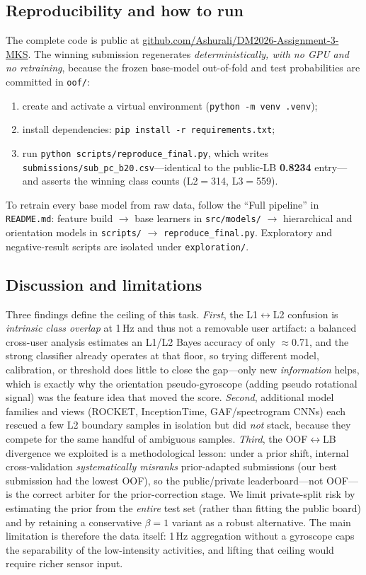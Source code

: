\documentclass[conference]{IEEEtran}
\begin{document}
\subsection{Reproducibility and how to run}
\label{sec:repro}
The complete code is public at \href{https://github.com/Ashurali/DM2026-Assignment-3-MKS}{\color{blue}github.com/Ashurali/DM2026-Assignment-3-MKS}. The winning submission regenerates \emph{deterministically, with no GPU and no retraining}, because the frozen base-model out-of-fold and test probabilities are committed in \texttt{oof/}:
\begin{enumerate}
\item create and activate a virtual environment (\texttt{python -m venv .venv});
\item install dependencies: \texttt{pip install -r requirements.txt};
\item run \texttt{python scripts/reproduce\_final.py}, which writes \texttt{submissions/sub\_pc\_b20.csv}---identical to the public-LB \textbf{0.8234} entry---and asserts the winning class counts (L2$=$314, L3$=$559).
\end{enumerate}
To retrain every base model from raw data, follow the ``Full pipeline'' in \texttt{README.md}: feature build $\rightarrow$ base learners in \texttt{src/models/} $\rightarrow$ hierarchical and orientation models in \texttt{scripts/} $\rightarrow$ \texttt{reproduce\_final.py}. Exploratory and negative-result scripts are isolated under \texttt{exploration/}.

\subsection{Discussion and limitations}
Three findings define the ceiling of this task. \emph{First}, the L1$\leftrightarrow$L2 confusion is
\emph{intrinsic class overlap} at 1\,Hz and thus not a removable user artifact: a balanced cross-user analysis
estimates an L1/L2 Bayes accuracy of only $\approx$0.71, and the strong classifier already operates at that
floor, so trying different model, calibration, or threshold does little to close the gap---only new \emph{information} helps,
which is exactly why the orientation pseudo-gyroscope (adding pseudo rotational signal) was the feature
idea that moved the score. \emph{Second}, additional model families and views (ROCKET, InceptionTime,
GAF/spectrogram CNNs) each rescued a few L2 boundary samples in isolation but did \emph{not} stack, because
they compete for the same handful of ambiguous samples.
\emph{Third}, the OOF$\leftrightarrow$LB divergence we exploited is a methodological lesson: under a prior shift, internal cross-validation \emph{systematically misranks} prior-adapted submissions (our best
submission had the lowest OOF), so the public/private leaderboard---not OOF---is the correct arbiter for the
prior-correction stage. We limit private-split risk by estimating the prior from the \emph{entire} test set
(rather than fitting the public board) and by retaining a conservative $\beta{=}1$ variant as a robust
alternative. The main limitation is therefore the data itself: 1\,Hz aggregation without a gyroscope caps
the separability of the low-intensity activities, and lifting that ceiling would require richer sensor input.
\end{document}
